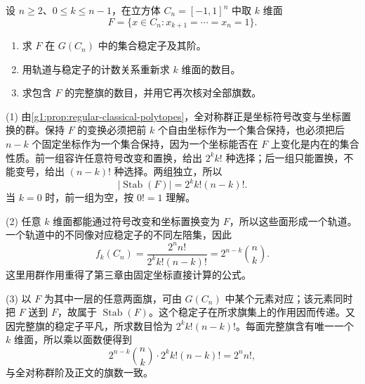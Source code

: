 \begin{exercise}
	\label{g1:ex:cube-face-stabilizer}
	设 \(n\ge2\)、\(0\le k\le n-1\)，在立方体 \(C_n=[-1,1]^n\) 中取 \(k\) 维面
	\[
		F=\{x\in C_n:x_{k+1}=\cdots=x_n=1\}.
	\]
	\begin{enumerate}
		\item 求 \(F\) 在 \(G(C_n)\) 中的集合稳定子及其阶。
		\item 用轨道与稳定子的计数关系重新求 \(k\) 维面的数目。
		\item 求包含 \(F\) 的完整旗的数目，并用它再次核对全部旗数。
	\end{enumerate}
\end{exercise}
\begin{solution}
	(1) 由\cref{g1:prop:regular-classical-polytopes}，全对称群正是坐标符号改变与坐标置换的群。保持 \(F\) 的变换必须把前 \(k\) 个自由坐标作为一个集合保持，也必须把后 \(n-k\) 个固定坐标作为一个集合保持，因为一个坐标能否在 \(F\) 上变化是内在的集合性质。前一组容许任意符号改变和置换，给出 \(2^k k!\) 种选择；后一组只能置换，不能变号，给出 \((n-k)!\) 种选择。两组独立，所以
	\[
		|\operatorname{Stab}(F)|=2^k k!(n-k)!.
	\]
	当 \(k=0\) 时，前一组为空，按 \(0!=1\) 理解。

	(2) 任意 \(k\) 维面都能通过符号改变和坐标置换变为 \(F\)，所以这些面形成一个轨道。一个轨道中的不同像对应稳定子的不同左陪集，因此
	\[
		f_k(C_n)=\frac{2^n n!}{2^k k!(n-k)!}
		=2^{n-k}\binom nk.
	\]
	这里用群作用重得了第三章由固定坐标直接计算的公式。

	(3) 以 \(F\) 为其中一层的任意两面旗，可由 \(G(C_n)\) 中某个元素对应；该元素同时把 \(F\) 送到 \(F\)，故属于 \(\operatorname{Stab}(F)\)。这个稳定子在所求旗集上的作用因而传递。又因完整旗的稳定子平凡，所求数目恰为 \(2^k k!(n-k)!\)。每面完整旗含有唯一一个 \(k\) 维面，所以乘以面数便得到
	\[
		2^{n-k}\binom nk\cdot2^k k!(n-k)!=2^n n!,
	\]
	与全对称群阶及正文的旗数一致。
\end{solution}

